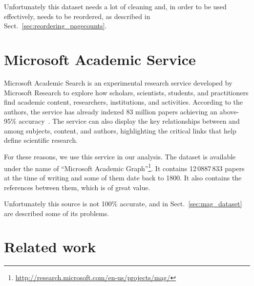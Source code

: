 Unfortunately this dataset needs a lot of cleaning and, in order to be used effectively, needs to be reordered, as described in Sect.~\ref{sec:reordering_pagecounts}.

\section{Microsoft Academic Service}
\label{sec:mag}
Microsoft Academic Search is an experimental research service developed by Microsoft Research to explore how scholars, scientists, students, and practitioners find academic content, researchers, institutions, and activities.
According to the authors, the service has already indexed 83 million papers achieving an above-95\% accuracy~\cite{Sinha2015}.
The service can also display the key relationships between and among subjects, content, and authors, highlighting the critical links that help define scientific research.

For these reasons, we use this service in our analysis.
The dataset is available under the name of ``Microsoft Academic Graph''\footnote{\url{http://research.microsoft.com/en-us/projects/mag/}}.
It contains 12\,0887\,833 papers at the time of writing and some of them date back to 1800.
It also contains the references between them, which is of great value.

Unfortunately this source is not 100\% accurate, and in Sect.~\ref{sec:mag_dataset} are described some of its problems.



%
%


\section{Related work}
\label{sec:relatedwork}
